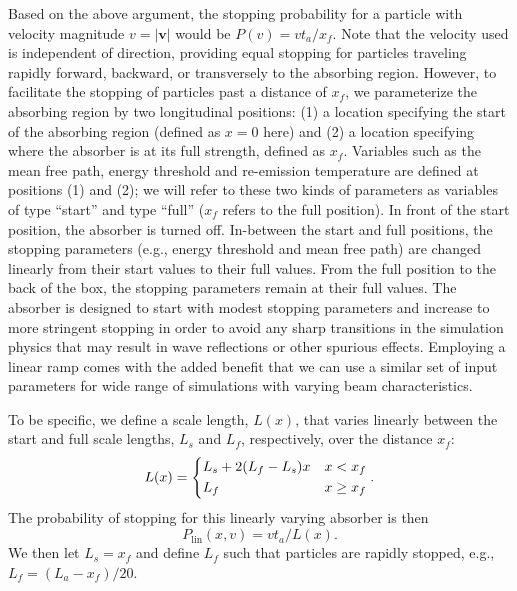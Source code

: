 \documentclass[../absorber.tex]{subfiles}
\begin{document}
Based on the above argument, the stopping probability for a particle with velocity magnitude $v=|\mathbf{v}|$ would be $P(v) = vt_a/x_f$.  Note that the velocity used is independent of direction, providing equal stopping for particles traveling rapidly forward, backward, or transversely to the absorbing region.  However, to facilitate the stopping of particles past a distance of $x_f$, we parameterize the absorbing region by two longitudinal positions: (1) a location specifying the start of the absorbing region (defined as $x=0$ here) and (2) a location specifying where the absorber is at its full strength, defined as $x_f$.  Variables such as the mean free path, energy threshold and re-emission temperature are defined at positions (1) and (2); we will refer to these two kinds of parameters as variables of type ``start'' and type ``full'' ($x_f$ refers to the full position).  In front of the start position, the absorber is turned off.  In-between the start and full positions, the stopping parameters (e.g., energy threshold and mean free path) are changed linearly from their start values to their full values.  From the full position to the back of the box, the stopping parameters remain at their full values.  The absorber is designed to start with modest stopping parameters and increase to more stringent stopping in order to avoid any sharp transitions in the simulation physics that may result in wave reflections or other spurious effects.  Employing a linear ramp comes with the added benefit that we can use a similar set of input parameters for wide range of simulations with varying beam characteristics.

To be specific, we define a scale length, $L(x)$, that varies linearly between the start and full scale lengths, $L_s$ and $L_f$, respectively, over the distance $x_f$:
\begin{equation} \label{Eq:length}
    L(x) = \begin{dcases} 
      L_s + 2(L_f-L_s)x & x < x_f \\
      L_f & x \geq x_f
   \end{dcases}.
\end{equation}
The probability of stopping for this linearly varying absorber is then
\begin{equation}
    P_\mathrm{lin}(x,v) = vt_a/L(x).
\end{equation}
We then let $L_s=x_f$ and define $L_f$ such that particles are rapidly stopped, e.g., $L_f=(L_a-x_f)/20$.
\end{document}
